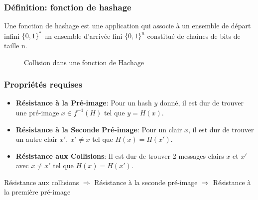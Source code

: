 \begin{frame}[fragile]
  \frametitle{Définition: fonction de hashage}
  \vfill

Une fonction de hashage est une application qui associe à un ensemble de départ infini $\{0,1\}^*$ un ensemble d'arrivée fini  $\{0,1\}^n$ constitué de chaînes de bits de taille n.

    \vfill

    \begin{figure}[H]
        \centering
        \caption{Collision dans une fonction de Hachage}
    \end{figure}

    \vfill

\end{frame}

\begin{frame}[fragile]
  \frametitle{Propriétés requises}
  \vfill
  \begin{itemize}
  \item \textbf{Résistance à la Pré-image}: Pour un hash $y$ donné, il est dur de trouver une pré-image $x \in f^{-1}(H)$ tel que $y = H(x)$.
  \item \textbf{Résistance à la Seconde Pré-image}: Pour un clair $x$, il est dur de trouver un autre clair $x',\ x'\neq x$ tel que $H(x) = H(x')$.
  \item \textbf{Résistance aux Collisions}: Il est dur de trouver 2 messages clairs $x$ et $x'$ avec $x \neq x'$ tel que $H(x) = H(x')$.
  \end{itemize}
  \vspace{0.8cm}
  Résistance aux collisions $\Rightarrow$ Résistance à la seconde pré-image $\Rightarrow$ Résistance à la première pré-image
  \vfill
\end{frame}

